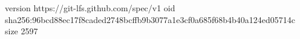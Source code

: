 version https://git-lfs.github.com/spec/v1
oid sha256:96bcd88ec17f8caded2748bcffb9b3077a1e3cf0a685f68b4b40a124ed05714c
size 2597
